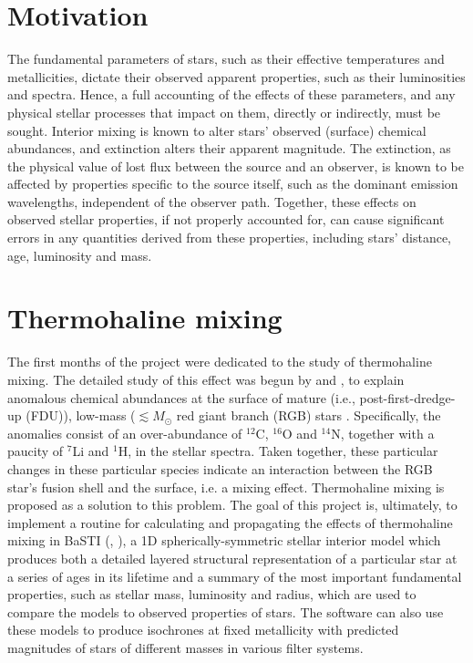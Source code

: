 \documentclass[12pt, a4paper]{report}
\begin{document}
\section{Motivation}
The fundamental parameters of stars, such as their effective temperatures and metallicities, dictate their observed apparent properties, such as their luminosities and spectra. Hence, a full accounting of the effects of these parameters, and any physical stellar processes that impact on them, directly or indirectly, must be sought. Interior mixing is known to alter stars' observed (surface) chemical abundances, and extinction alters their apparent magnitude. The extinction, as the physical value of lost flux between the source and an observer, is known to be affected by properties specific to the source itself, such as the dominant emission wavelengths, independent of the observer path.
Together, these effects on observed stellar properties, if not properly accounted for, can cause significant errors in any quantities derived from these properties, including stars' distance, age, luminosity and mass. 

\section{Thermohaline mixing}
The first months of the project were dedicated to the study of thermohaline mixing. The detailed study of this effect was begun by \cite{1972ApJ...172..165U} and \cite{1980A&A....91..175K}, to explain anomalous chemical abundances at the surface of mature (i.e., post-first-dredge-up (FDU)), low-mass ($\lesssim M_{\odot}$ red giant branch (RGB) stars \cite{2010A&A...521A...9C}. Specifically, the anomalies consist of an over-abundance of $^{12}$C, $^{16}$O and $^{14}$N, together with a paucity of $^{7}$Li and $^{1}$H, in the stellar spectra. Taken together, these particular changes in these particular species indicate an interaction between the RGB star's fusion shell and the surface, i.e. a mixing effect. Thermohaline mixing is proposed as a solution to this problem. The goal of this project is, ultimately, to implement a routine for calculating and propagating the effects of thermohaline mixing in BaSTI (\cite{2004ApJ...612..168P}, \cite{2008ASPC..394..285P}), a 1D spherically-symmetric stellar interior model which produces both a detailed layered structural representation of a particular star at a series of ages in its lifetime and a summary of the most important fundamental properties, such as stellar mass, luminosity and radius, which are used to compare the models to observed properties of stars. The software can also use these models to produce isochrones at fixed metallicity \citep{2013A&A...558A..46P} with predicted magnitudes of stars of different masses in various filter systems.
\end{document}

